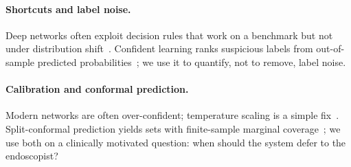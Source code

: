\paragraph{Shortcuts and label noise.}
Deep networks often exploit decision rules that work on a benchmark but not under distribution
shift~\cite{geirhos2020shortcut}. Confident learning ranks suspicious labels from out-of-sample predicted
probabilities~\cite{northcutt2021confident}; we use it to quantify, not to remove, label noise.

\paragraph{Calibration and conformal prediction.}
Modern networks are often over-confident; temperature scaling is a simple fix~\cite{guo2017calibration}.
Split-conformal prediction yields sets with finite-sample marginal coverage~\cite{angelopoulos2023conformal}; we
use both on a clinically motivated question: when should the system defer to the endoscopist?
